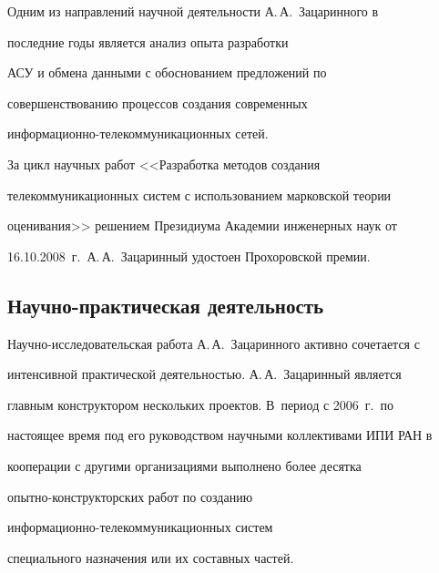    Одним из направлений научной деятельности А.\,А.~Зацаринного в 


последние годы является анализ опыта разработки 


АСУ и обмена данными с обоснованием предложений по 


совершенствованию процессов создания современных 


   ин\-фор\-ма\-ци\-он\-но-телекоммуникационных сетей.





За цикл научных работ <<Разработка методов создания 


телекоммуникационных сис\-тем с использованием марковской теории 


оценивания>> решением Президиума Академии инженерных наук от 


16.10.2008~г.\ А.\,А.~Зацаринный удостоен Прохоровской премии.





\vspace*{-6pt}





\subsection*{Научно-практическая деятельность}





\vspace*{-3pt}





Научно-исследовательская работа А.\,А.~Зацаринного активно сочетается с 


интенсивной практической деятельностью. А.\,А.~Зацаринный является 


главным конструктором нескольких проектов. В~период с 2006~г.\ по 


настоящее время под его руководством научными коллективами ИПИ РАН в 


кооперации с другими организациями выполнено более десятка 


опыт\-но-кон\-ст\-рук\-тор\-ских работ по созданию 


ин\-фор\-ма\-ци\-он\-но-те\-ле\-ком\-му\-ни\-ка\-ци\-он\-ных сис\-тем 


специального назначения или их составных частей.





